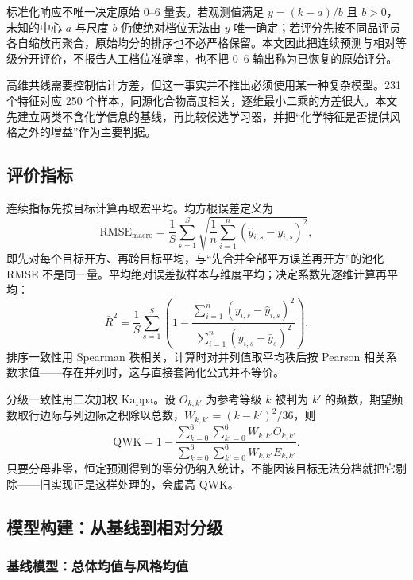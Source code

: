 \documentclass[UTF8,a4paper,zihao=-4]{ctexart}
\numberwithin{figure}{section}
\numberwithin{table}{section}
\numberwithin{equation}{section}
\begin{document}
标准化响应不唯一决定原始 0--6 量表。若观测值满足 $y=(k-a)/b$ 且 $b>0$，未知的中心 $a$ 与尺度 $b$ 仍使绝对档位无法由 $y$ 唯一确定；若评分先按不同品评员各自缩放再聚合，原始均分的排序也不必严格保留。本文因此把连续预测与相对等级分开评价，不报告人工档位准确率，也不把 0--6 输出称为已恢复的原始评分。

高维共线需要控制估计方差，但这一事实并不推出必须使用某一种复杂模型。231 个特征对应 250 个样本，同源化合物高度相关，逐维最小二乘的方差很大。本文先建立两类不含化学信息的基线，再比较候选学习器，并把“化学特征是否提供风格之外的增益”作为主要判据。

\subsection{评价指标}

连续指标先按目标计算再取宏平均。均方根误差定义为
\begin{equation}
\mathrm{RMSE}_{\mathrm{macro}}=\frac{1}{S}\sum_{s=1}^{S}\sqrt{\frac{1}{n}\sum_{i=1}^{n}\left(\hat y_{i,s}-y_{i,s}\right)^{2}},
\label{eq:rmse-macro}
\end{equation}
即先对每个目标开方、再跨目标平均，与“先合并全部平方误差再开方”的池化 RMSE 不是同一量。平均绝对误差按样本与维度平均；决定系数先逐维计算再平均：
\begin{equation}
\bar R^{2}=\frac{1}{S}\sum_{s=1}^{S}\left(1-\frac{\sum_{i=1}^{n}(y_{i,s}-\hat y_{i,s})^{2}}{\sum_{i=1}^{n}(y_{i,s}-\bar y_{s})^{2}}\right).
\label{eq:r2-macro}
\end{equation}
排序一致性用 Spearman 秩相关，计算时对并列值取平均秩后按 Pearson 相关系数求值——存在并列时，这与直接套简化公式并不等价。

分级一致性用二次加权 Kappa\cite{cohen1968}。设 $O_{k,k'}$ 为参考等级 $k$ 被判为 $k'$ 的频数，期望频数取行边际与列边际之积除以总数，$W_{k,k'}=(k-k')^{2}/36$，则
\begin{equation}
\mathrm{QWK}=1-\frac{\sum_{k=0}^{6}\sum_{k'=0}^{6}W_{k,k'}O_{k,k'}}{\sum_{k=0}^{6}\sum_{k'=0}^{6}W_{k,k'}E_{k,k'}}.
\label{eq:qwk}
\end{equation}
只要分母非零，恒定预测得到的零分仍纳入统计，不能因该目标无法分档就把它剔除——旧实现正是这样处理的，会虚高 QWK。

\subsection{模型构建：从基线到相对分级}

\subsubsection{基线模型：总体均值与风格均值}
\end{document}
